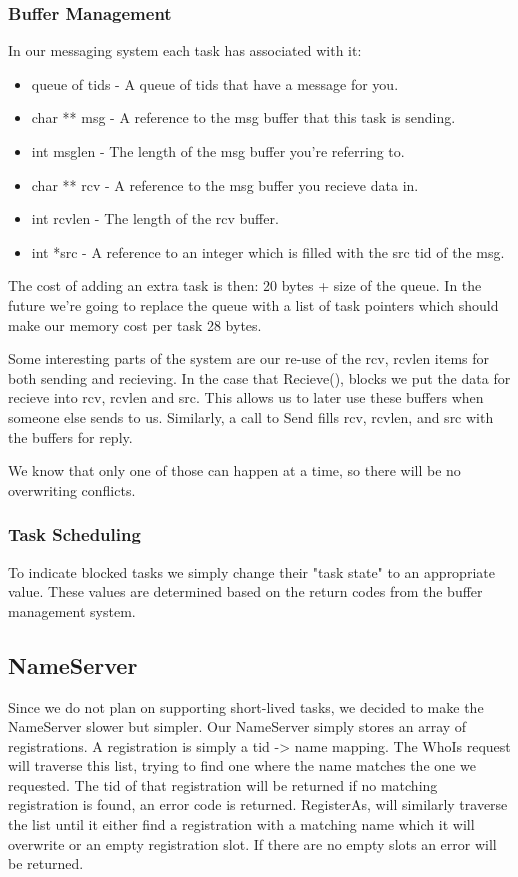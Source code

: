 \documentclass{article}
\begin{document}
\subsubsection{Buffer Management}

In our messaging system each task has associated with it:
\begin{itemize}
    \item queue of tids - A queue of tids that have a message for you.
    \item char ** msg - A reference to the msg buffer that this task is sending.
    \item int msglen - The length of the msg buffer you're referring to.
    \item char ** rcv - A reference to the msg buffer you recieve data in.
    \item int rcvlen - The length of the rcv buffer.
    \item int *src - A reference to an integer which is filled with the src tid of the msg.
\end{itemize}

The cost of adding an extra task is then: 20 bytes + size of the queue. In the future we're going to replace the queue with a list of task pointers which should make our memory cost per task 28 bytes.

Some interesting parts of the system are our re-use of the rcv, rcvlen items for both sending and recieving. In the case that Recieve(), blocks we put the data for recieve into rcv, rcvlen and src. This allows us to later use these buffers when someone else sends to us. Similarly, a call to Send fills rcv, rcvlen, and src with the buffers for reply.

We know that only one of those can happen at a time, so there will be no overwriting conflicts.

\subsubsection{Task Scheduling}

To indicate blocked tasks we simply change their "task state" to an appropriate value. These values are determined based on the return codes from the buffer management system.

\subsection{NameServer}

Since we do not plan on supporting short-lived tasks, we decided to make the NameServer slower but simpler. Our NameServer simply stores an array of registrations. A registration is simply a tid -> name mapping. The WhoIs request will traverse this list, trying to find one where the name matches the one we requested. The tid of that registration will be returned if no matching registration is found, an error code is returned. RegisterAs, will similarly traverse the list until it either find a registration with a matching name which it will overwrite or an empty registration slot. If there are no empty slots an error will be returned.
\end{document}
